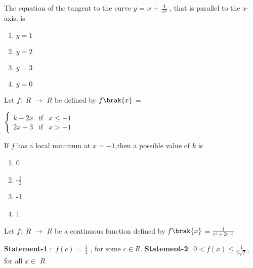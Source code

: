             
        \item The equation of the tangent to the curve $y$ = $x$ + $\frac{4}{x^2}$ , that is parallel to the $x$-axis, is\hfill{}
         \begin{multicols}{4}
        \begin{enumerate}
        
            
        
            \item $y=1$
        \item $y=2$
        \item $y=3$
        \item $y=0$
        \end{enumerate}
        \end{multicols}
            
        \item Let $f$$\colon$ $R$ $\to$ $R$ be defined by $f\brak{x}$ = 
    
 $\left\{ \begin{array}{rcl}
     k-2x & \text{if} &  x\leq -1 \\ 2x+3 & \text{if} & x>-1
     \end{array}\right.$
        
        
        If $f$ has a local minimum at $x = -1$,then a possible value of $k$ is\hfill{}
         \begin{multicols}{4}
        
        
        \begin{enumerate}
        
            
        
        \item 0
        \item -$\frac{1}{2}$
        \item -1
        \item 1
        
        \end{enumerate}
        \end{multicols}
            
     \item Let $f$$\colon$ $R$ $\to$ $R$ be a continuous function defined by $f\brak{x}$ = $\frac{1}{e^x + 2e^{-x}}$ \hfill{}
      
       
       \begin{enumerate}
           
           
    \textbf{Statement-1} $\colon$ $f(c)$ = $\frac{1}{3}$ , for some $c$$\in$$R$.
         \newline   \textbf{Statement-2}$\colon$ 0$<$$f(x)$$\leq$$\frac{1}{2\sqrt{2}}$, for all $x$$\in$ $R$
            
       \end{enumerate}
       
